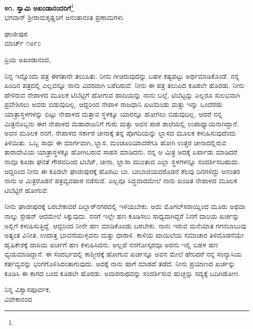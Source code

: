\begin{center}
\textbf{೪೧. ಸ್ವಾಮಿ ಅಖಂಡಾನಂದರಿಗೆ}\footnote{}\\ ಭಗವಾನ್ ಶ‍್ರೀರಾಮಕೃಷ್ಣರಿಗೆ ಅನಂತಾನಂತ ಪ್ರಣಾಮಗಳು
\end{center}

\vspace{-0.5cm}

\begin{flushright}
ಘಾಜೀಪುರ\\ಮಾರ್ಚ್ ೧೮೯೦
\end{flushright}

\noindent
ಪ್ರಿಯ ಅಖಂಡಾನಂದ,

ನಿನ್ನ ಇನ್ನೊಂದು ಪತ್ರ ಈಗತಾನೇ ತಲುಪಿತು. ನೀನು ಗೀಚಿರುವುದನ್ನು ಬಹಳ ಕಷ್ಟಪಟ್ಟು ಅರ್ಥಮಾಡಿಕೊಂಡೆ. ನನ್ನ ಹಿಂದಿನ ಪತ್ರದಲ್ಲಿ ಎಲ್ಲವನ್ನೂ ನಾನು ವಿವರವಾಗಿ ಬರೆದಿರುವೆ. ನೀನು ಈ ಪತ್ರ ತಲುಪಿದ ಕೂಡಲೇ ಹೊರಡು. ನೀನು ಹೇಳಿರುವ ನೇಪಾಳದ ಮೂಲಕ ಟಿಬೆಟ್ಟಿಗೆ ಹೋಗುವ ಹಾದಿಯನ್ನು ನಾನು ಬಲ್ಲೆ. ಟಿಬೆಟ್ಟನ್ನು ಎಲ್ಲರೂ ಸುಲಭವಾಗಿ ಪ್ರವೇಶಿಸಲು ಅವರು ಬಿಡುವುದಿಲ್ಲ. ಆದ್ದರಿಂದ ನೇಪಾಳ ರಾಜಧಾನಿ ಖಟಮಂಡು ಮತ್ತು ಇನ್ನು ಒಂದೆರಡು ಯಾತ್ರಾಸ್ಥಳಗಳನ್ನು ಬಿಟ್ಟು ನೇಪಾಳದ ಮತ್ತಾವ ಸ್ಥಳಕ್ಕೂ ಯಾರನ್ನೂ ಹೋಗಲು ಬಿಡುವುದಿಲ್ಲ. ಆದರೆ ನನ್ನ ಮಿತ್ರನೊಬ್ಬನು ಈಗ ನೇಪಾಳದ ಮಹಾರಾಜನಿಗೆ ಗುರು ಮತ್ತು ಅವನ ಪಾಠ ಶಾಲೆಯಲ್ಲಿ ಉಪಾಧ್ಯಾಯನಾಗಿದ್ದಾನೆ. ಅವನ ಮೂಲಕ ನನಗೆ, ನೇಪಾಳದ ಸರ್ಕಾರ ಚೀನಾಕ್ಕೆ ತನ್ನ ಪೊಗದಿಯನ್ನು ಲ್ಹಾಸದ ಮೂಲಕ ಕಳುಹಿಸುವುದೆಂದು ತಿಳಿಯಿತು. ಒಬ್ಬ ಸಾಧು ಈ ಮಾರ್ಗವಾಗಿ,.ಲ್ಹಾಸ, ಮಂಚೂರಿಯಾವರೆಗೂ ಹೋಗಿ ಉತ್ತರ ಚೀನಾದಲ್ಲಿರುವ ತಾರಾದೇವಿಯ ಯಾತ್ರಾಸ್ಥಳಕ್ಕೂ ಹೋಗಿಬರುವ ಸಾಹಸ ಮಾಡಿದನು. ನನ್ನ ಆ ಮಿತ್ರ ಅದಕ್ಕೆ ಏರ್ಪಾಡು ಮಾಡಿದರೆ ನಾವೂ ಕೂಡಾ ಘನತೆ ಗೌರವದಿಂದ ಟಿಬೆಟ್, ಚೀನಾ, ಲ್ಹಾಸಾ ಮುಂತಾದ ಎಲ್ಲಾ ಸ್ಥಳಗಳನ್ನೂ ಸಂದರ್ಶಿಸಬಹುದು. ಆದ್ದರಿಂದ ನೀನು ಈ ಕೂಡಲೇ ಘಾಜೀಪುರಕ್ಕೆ ಹೊರಟು ಬಾ. ಬಾಬಾಜಿಯವರೊಡನೆ ಕೆಲವು ದಿನಗಳಿದ್ದು ಅನಂತರ ನಾನು ಆ ಮಿತ್ರರೊಡನೆ ಪತ್ರವ್ಯವಹಾರ ನಡೆಸುವೆ. ಎಲ್ಲವೂ ಸಿದ್ಧವಾದಮೇಲೆ ನಾನು ಖಂಡಿತ ನೇಪಾಳದ ಮೂಲಕ ಟಿಬೆಟ್ಟಿಗೆ ಹೋಗುವೆ.

ನೀನು ಘಾಜೀಪುರಕ್ಕೆ ಬರಬೇಕಾದರೆ ದಿಲ್ಲಾರ್‌ನಗರದಲ್ಲಿ ಇಳಿಯಬೇಕು. ಅದು ಮೊಗಲ್‌ಸರಾಯ್ನಿಂದ ಮೂರು ಅಥವಾ ನಾಲ್ಕು ಸ್ಟೇಷನ್ ಆದಮೇಲೆ ಸಿಕ್ಕುವುದು. ನನಗೆ ಇಲ್ಲೇ ಹಣ ಕೂಡಿಸಲು ಸಾಧ್ಯವಾಗಿದ್ದರೆ ನಿನಗೆ ದಾರಿಯ ಖರ್ಚನ್ನು ಅಲ್ಲಿಗೆ ಕಳುಹಿಸುತ್ತಿದ್ದೆ. ಆದ್ದರಿಂದ ನೀನೇ ಹಣ ಮಾಡಿಕೊಂಡು ಬರಬೇಕು. ನಾನು ಇರುವ ಮನೆಯಾತ ಗಗನಬಾಬುವು ಅತ್ಯಂತ ವಿನೀತ, ಉದಾತ್ತ ಭಾವನೆಯುಳ್ಳವನು ಮತ್ತು ಧಾರಾಳಿ. ಕಾಳಿಯ ಖಾಯಿಲೆಯ ಸಮಾಚಾರ ತಿಳಿದೊಡನೆಯೇ ಹೃಷಿಕೇಶಕ್ಕೆ ದಾರಿಯ ಖರ್ಚಿಗೆ ಹಣ ಕಳುಹಿಸಿದನು. ಅಲ್ಲದೆ ನನಗೋಸ್ಕರವೂ ಅವನು ಇಲ್ಲಿ ಬಹಳ ಹಣ ವ್ಯಯಮಾಡಿದ್ದಾನೆ. ಈ ಸಂದರ್ಭದಲ್ಲಿ ಕಾಶ್ಮೀರಕ್ಕೆ ಹೋಗುವ ಖರ್ಚನ್ನೂ ಅವನ ಮೇಲೆ ಹೇರಿದರೆ ನನ್ನ ಸಂನ್ಯಾಸಿಯ ಕರ್ತವ್ಯವನ್ನು ಭಂಗಗೊಳಿಸಿದಂತಾಗುವುದು. ಅದಕ್ಕೆ ನಾನು ಹಾಗೆ ಮಾಡದೆ ತಡೆದೆ. ನೀನು ಪ್ರಯಾಣದ ಖರ್ಚನ್ನು ಕೂಡಿಸಿ ಈ ಕಾಗದ ಬಂದ ಕೂಡಲೇ ಹೊರಡು. ಅಮರನಾಥವನ್ನು ಸಂದರ್ಶಿಸುವ ಹುಚ್ಚನ್ನು ಸದ್ಯಕ್ಕೆ ಬದಿಗಿಡೋಣ.

\vspace{-0.3cm}

{\flushright
ನಿನ್ನ ವಿಶ್ವಾಸಪೂರ್ವಕ,\\ವಿವೇಕಾನಂದ\par}


